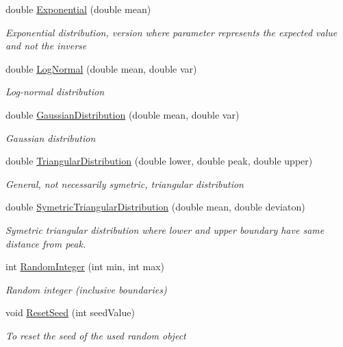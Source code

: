 \begin{DoxyCompactItemize}
\item 
double \hyperlink{class_simulation_core_1_1_math_tool_1_1_distributions_1_1_distributions_a0b15a82a78aed8be9aec72d5ed5f20ff}{Exponential} (double mean)
\begin{DoxyCompactList}\small\item\em Exponential distribution, version where parameter represents the expected value and not the inverse \end{DoxyCompactList}\item 
double \hyperlink{class_simulation_core_1_1_math_tool_1_1_distributions_1_1_distributions_a998800cc6b263c369fe31b1eca5fa1f6}{Log\+Normal} (double mean, double var)
\begin{DoxyCompactList}\small\item\em Log-\/normal distribution \end{DoxyCompactList}\item 
double \hyperlink{class_simulation_core_1_1_math_tool_1_1_distributions_1_1_distributions_a4c9f6701a6e269cf7e035882733088e5}{Gaussian\+Distribution} (double mean, double var)
\begin{DoxyCompactList}\small\item\em Gaussian distribution \end{DoxyCompactList}\item 
double \hyperlink{class_simulation_core_1_1_math_tool_1_1_distributions_1_1_distributions_aa611544c89fd15a50e23987660dd252d}{Triangular\+Distribution} (double lower, double peak, double upper)
\begin{DoxyCompactList}\small\item\em General, not necessarily symetric, triangular distribution \end{DoxyCompactList}\item 
double \hyperlink{class_simulation_core_1_1_math_tool_1_1_distributions_1_1_distributions_a831523e3ac42c2ac7d0f899752d40d24}{Symetric\+Triangular\+Distribution} (double mean, double deviaton)
\begin{DoxyCompactList}\small\item\em Symetric triangular distribution where lower and upper boundary have same distance from peak. \end{DoxyCompactList}\item 
int \hyperlink{class_simulation_core_1_1_math_tool_1_1_distributions_1_1_distributions_ab49eab576a26daf876845855d550c8d7}{Random\+Integer} (int min, int max)
\begin{DoxyCompactList}\small\item\em Random integer (inclusive boundaries) \end{DoxyCompactList}\item 
void \hyperlink{class_simulation_core_1_1_math_tool_1_1_distributions_1_1_distributions_aa2ffca20c79399dbfa2cbd364fa1b4f8}{Reset\+Seed} (int seed\+Value)
\begin{DoxyCompactList}\small\item\em To reset the seed of the used random object \end{DoxyCompactList}\end{DoxyCompactItemize}
